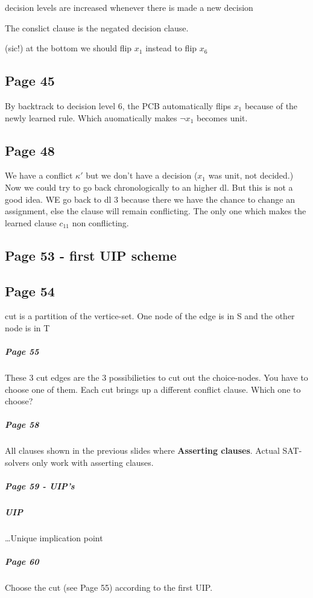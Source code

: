 \documentclass[a4paper]{article}
\newcommand{\tb}[1]{\textbf{#1}}
\begin{document}
decision levels are increased whenever there is made a new decision

The conslict clause is the negated decision clause.

(sic!) at the bottom we should flip $x_1$ instead to flip $x_6$

\subsection{Page 45}
By backtrack to decision level 6, the PCB automatically flips $x_1$ because of
the newly learned rule. Which auomatically makes $\neg x_1$ becomes unit.


\subsection{Page 48}
We have a conflict $\kappa'$ but we don't have a decision ($x_1$ was unit, not
decided.) Now we could try to go back chronologically to an higher dl. But this
is not a good idea. WE go back to dl 3 because there we have the chance to
change an assignment, else the clause will remain conflicting. The only one
which makes the learned clause $c_11$ non conflicting.


\subsection{Page 53 - first UIP scheme}

\subsection{Page 54}
cut is a partition of the vertice-set. One node of the edge is in S and the
other node is in T

\subparagraph{Page 55}

These 3 cut edges are the 3 possibilieties to cut out the choice-nodes. You have
to choose one of them. Each cut brings up a different conflict clause. Which one
to choose?

\subparagraph{Page 58}

All clauses shown in the previous slides where \tb{Asserting clauses}.
Actual SAT-solvers only work with asserting clauses.

\subparagraph{Page 59 - UIP's}
\subparagraph{UIP} \ldots Unique implication point

\subparagraph{Page 60}

Choose the cut (see Page 55) according to the first UIP.
\end{document}
